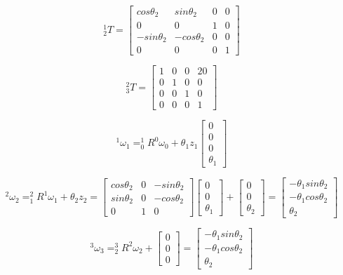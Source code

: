 \documentclass[12pt]{article}
\begin{document}
\[^1_{2}T=\left[
\begin{array}{cccc}
cos\theta_2 & sin\theta_2 & 0 & 0 \\
0 & 0 & 1 & 0 \\
-sin\theta_2 & -cos\theta_2 & 0 & 0 \\
0 & 0 & 0 & 1
\end{array} \right]\]

\[^2_{3}T=\left[
\begin{array}{cccc}
1 & 0 & 0 & 20 \\
0 & 1 & 0 & 0 \\
0 & 0 & 1 & 0 \\
0 & 0 & 0 & 1
\end{array} \right]\]

\[^1\omega_1=^1_0 R ^0\omega_0 + \theta_1 z_1\left[
\begin{array}{c}
0 \\
0 \\
0 \\
\theta_1
\end{array} \right]\]


\[^2\omega_2=^2_1 R ^1\omega_1 + \theta_2 z_2=\left[
\begin{array}{ccc}
cos\theta_2 & 0 & -sin\theta_2\\
sin\theta_2 & 0 & -cos\theta_2 \\
0 & 1 & 0
\end{array} \right]\left[
\begin{array}{c}
0\\
0\\
\theta_1
\end{array} \right] + 
\left[
\begin{array}{c}
0\\
0\\
\theta_2
\end{array} \right] = 
\left[
\begin{array}{c}
-\theta_1 sin\theta_2\\
-\theta_1 cos\theta_2\\
\theta_2
\end{array} \right]  \]

\[^3\omega_3=^3_2R ^2\omega_2 +\left[
\begin{array}{c}
0\\
0\\
0
\end{array} \right] = 
\left[
\begin{array}{c}
-\theta_1 sin\theta_2\\
-\theta_1 cos\theta_2\\
\theta_2
\end{array} \right]  \]
\end{document}
